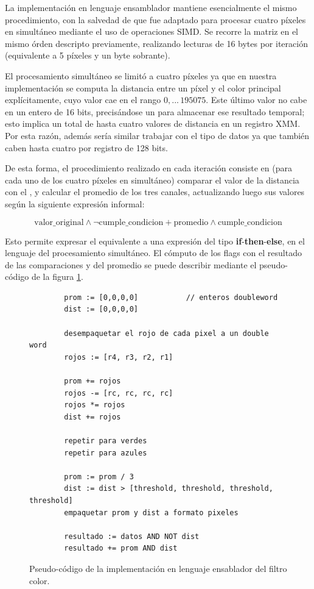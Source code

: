 La implementación en lenguaje ensamblador mantiene esencialmente el mismo procedimiento, con la salvedad de que fue adaptado para procesar cuatro píxeles en simultáneo mediante el uso de operaciones SIMD. Se recorre la matriz en el mismo órden descripto previamente, realizando lecturas de 16 bytes por iteración (equivalente a 5 píxeles y un byte sobrante).

El procesamiento simultáneo se limitó a cuatro píxeles ya que en nuestra implementación se computa la distancia entre un píxel y el color principal explícitamente, cuyo valor cae en el rango $0, ... \,195075$. Este último valor no cabe en un entero de 16 bits, precisándose un  para almacenar ese resultado temporal; esto implica un total de hasta cuatro valores de distancia en un registro XMM. Por esta razón, además sería similar trabajar con el tipo de datos  ya que también caben hasta cuatro por registro de 128 bits.

De esta forma, el procedimiento realizado en cada iteración consiste en (para cada uno de los cuatro píxeles en simultáneo) comparar el valor de la distancia con el , y calcular el promedio de los tres canales, actualizando luego sus valores según la siguiente expresión informal:

$$\text{valor\_original} \land \lnot \text{cumple\_condicion} + \text{promedio} \land \text{cumple\_condicion}$$

Esto permite expresar el equivalente a una expresión del tipo \textbf{if}-\textbf{then}-\textbf{else}, en el lenguaje del procesamiento simultáneo. El cómputo de los flags con el resultado de las comparaciones y del promedio se puede describir mediante el pseudo-código de la figura \ref{fig:pseudocodigo-filtro-color}.

\begin{figure}[h]
	\begin{mdframed}
	\begin{center}
		\begin{lstlisting}
		prom := [0,0,0,0] 			// enteros doubleword
		dist := [0,0,0,0]
	
		desempaquetar el rojo de cada pixel a un double word
		rojos := [r4, r3, r2, r1]
	
		prom += rojos
		rojos -= [rc, rc, rc, rc]
		rojos *= rojos
		dist += rojos
	
		repetir para verdes
		repetir para azules
	
		prom := prom / 3
		dist := dist > [threshold, threshold, threshold, threshold]
		empaquetar prom y dist a formato pixeles

		resultado := datos AND NOT dist
		resultado += prom AND dist
		\end{lstlisting}
	\end{center}
	\end{mdframed}
	\caption{Pseudo-código de la implementación en lenguaje ensablador del filtro color.}
	\label{fig:pseudocodigo-filtro-color}
\end{figure}

